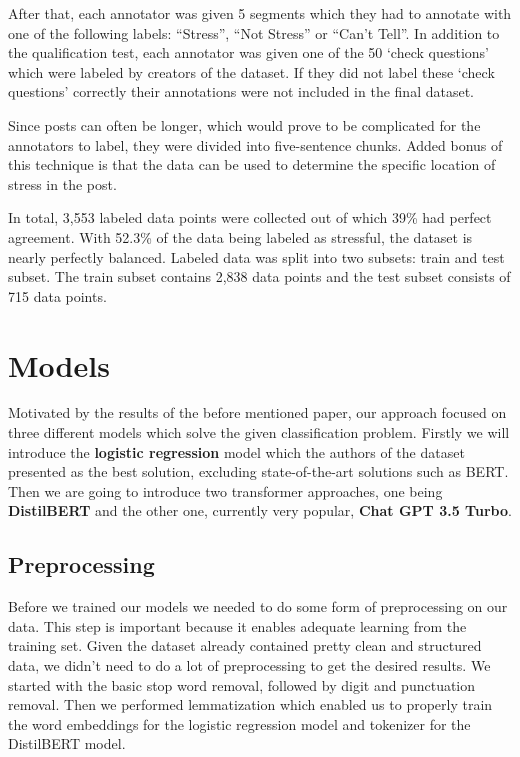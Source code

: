 \documentclass[10pt, a4paper]{article}
\begin{document}
After that, each annotator was given 5 segments which they had to annotate with one of the following labels: ``Stress'', ``Not Stress'' or ``Can't Tell''.
In addition to the qualification test, each annotator was given one of the 50 `check questions' which were labeled by creators of the dataset.
If they did not label these `check questions' correctly their annotations were not included in the final dataset.

Since posts can often be longer, which would prove to be complicated for the annotators to label, they were divided into five-sentence chunks.
Added bonus of this technique is that the data can be used to determine the specific location of stress in the post.

In total, 3,553 labeled data points were collected out of which 39\% had perfect agreement.
With 52.3\% of the data being labeled as stressful, the dataset is nearly perfectly balanced.
Labeled data was split into two subsets: train and test subset.
The train subset contains 2,838 data points and the test subset consists of 715 data points.

\section{Models}
Motivated by the results of the before mentioned paper, our approach focused on three different models which solve the given classification problem.
\hfill \break
\hfill \break
Firstly we will introduce the \textbf{logistic regression} model which the authors of the dataset presented as the best solution, excluding state-of-the-art solutions such as BERT.
Then we are going to introduce two transformer approaches, one being \textbf{DistilBERT} and the other one, currently very popular, \textbf{Chat GPT 3.5 Turbo}.

\subsection{Preprocessing}
Before we trained our models we needed to do some form of preprocessing on our data.
This step is important because it enables adequate learning from the training set.
Given the dataset already contained pretty clean and structured data, we didn't need to do a lot of preprocessing to get the desired results.
We started with the basic stop word removal, followed by digit and punctuation removal.
Then we performed lemmatization which enabled us to properly train the word embeddings for the logistic regression model and tokenizer for the DistilBERT model.
\end{document}
